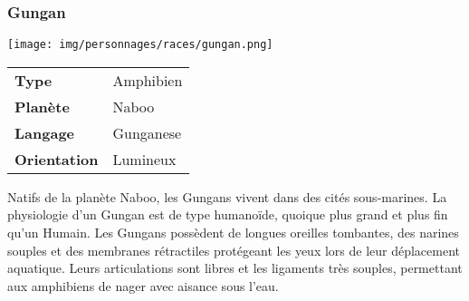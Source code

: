 \subsubsection{Gungan}
\begin{samepage}
	\vspace{-1\baselineskip}
	\texttt{[image: img/personnages/races/gungan.png]}
	\vspace{-12\baselineskip}

	\begin{flushright}
		\begin{tabular}{ l l }
			\textbf{Type} 			& Amphibien \\
		   	\textbf{Planète} 		& Naboo \\
		   	\textbf{Langage} 		& Gunganese \\
		   	\textbf{Orientation} 	& Lumineux \\
		\end{tabular}
	\end{flushright}

	\vspace{7\baselineskip}
\end{samepage}

Natifs de la planète Naboo, les Gungans vivent dans des cités sous-marines. La physiologie d’un Gungan est de type humanoïde, quoique plus grand et plus fin qu’un Humain. Les Gungans possèdent de longues oreilles tombantes, des narines souples et des membranes rétractiles protégeant les yeux lors de leur déplacement aquatique. Leurs articulations sont libres et les ligaments très souples, permettant aux amphibiens de nager avec aisance sous l’eau.


